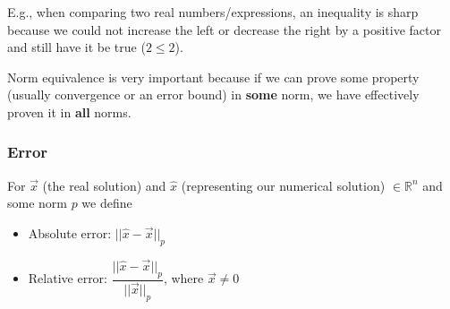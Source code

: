 \documentclass[12pt]{article}
\begin{document}
E.g., when comparing two real numbers/expressions, an inequality is sharp because we could not increase the left or decrease the right by a positive factor and still have it be true ($2 \leq 2$). 

%

Norm equivalence is very important because if we can prove some property (usually convergence or an error bound) in \textbf{some} norm, we have effectively proven it in \textbf{all} norms. 

\subsubsection*{Error}
For $\vec{x}$ (the real solution) and $\hat{x}$ (representing our numerical solution) $\in \mathbb{R}^n$ and some norm $p$ we define
%
\begin{itemize}
\item Absolute error: $||\hat{x} - \vec{x}||_p$
\item Relative error: $\dfrac{||\hat{x} - \vec{x}||_p}{||\vec{x}||_p}$, where $\vec{x} \neq 0$
\end{itemize}
\end{document}
